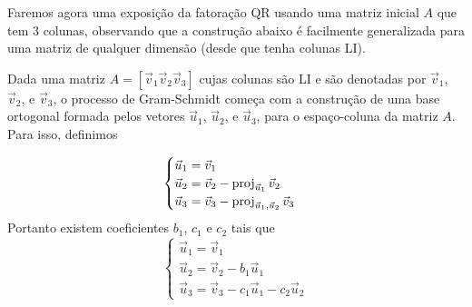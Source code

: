 \documentclass[../livro.tex]{subfiles}  %
\begin{document}
\medskip

Faremos agora uma exposição da fatoração QR usando uma matriz inicial $A$ que tem 3 colunas, observando que a construção abaixo é facilmente generalizada para uma matriz de qualquer dimensão (desde que tenha colunas LI).

Dada uma matriz $A=[\vec{v}_1 \vec{v}_2 \vec{v}_3]$ cujas colunas são LI e são denotadas por $\vec{v}_1$, $\vec{v}_2$, e $\vec{v}_3$, 
o processo de Gram-Schmidt começa com a construção de uma base ortogonal formada pelos vetores
$\vec{u}_1$, $\vec{u}_2$, e $\vec{u}_3$,
para o espaço-coluna da matriz $A$. Para isso, definimos

$$
\begin{cases}
\vec{u}_1 = \vec{v}_1 \\ 
\vec{u}_2 = \vec{v}_2 - \operatorname{proj}_{\vec{u}_1} \vec{v}_2 \\
\vec{u}_3 = \vec{v}_3 - \operatorname{proj}_{\vec{u}_1,\vec{u}_2} \vec{v}_3
\end{cases}
$$
Portanto existem coeficientes $b_1$, $c_1$ e $c_2$ tais que 
$$
\begin{cases}
\vec{u}_1 = \vec{v}_1 \\ 
\vec{u}_2 = \vec{v}_2 - b_1 \vec{u}_1 \\
\vec{u}_3 = \vec{v}_3 - c_1 \vec{u}_1 - c_2 \vec{u}_2
\end{cases}
$$
\end{document}
